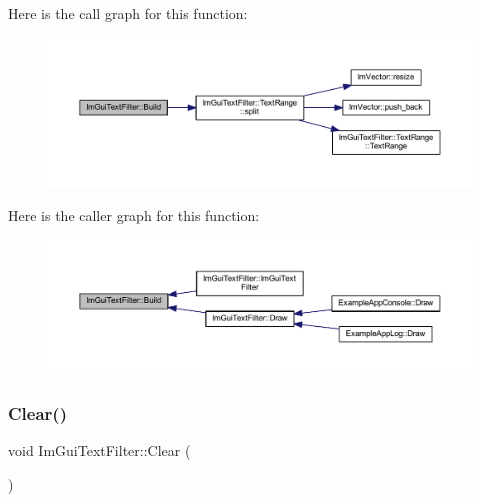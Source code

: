 Here is the call graph for this function\+:
\nopagebreak
\begin{figure}[H]
\begin{center}
\leavevmode
\includegraphics[width=350pt]{struct_im_gui_text_filter_aef362baafaa9dfa62d11bc6101c0f4c1_cgraph}
\end{center}
\end{figure}
Here is the caller graph for this function\+:
\nopagebreak
\begin{figure}[H]
\begin{center}
\leavevmode
\includegraphics[width=350pt]{struct_im_gui_text_filter_aef362baafaa9dfa62d11bc6101c0f4c1_icgraph}
\end{center}
\end{figure}
\mbox{\label{struct_im_gui_text_filter_a9043c1f0c33d29e6fc9b75ae81f9705a}} 
\subsubsection{\texorpdfstring{Clear()}{Clear()}}
{\footnotesize\ttfamily void Im\+Gui\+Text\+Filter\+::\+Clear (\begin{DoxyParamCaption}{ }\end{DoxyParamCaption})\hspace{0.3cm}{\ttfamily [inline]}}

\mbox{\label{struct_im_gui_text_filter_ab93ad5985019ff9d3781606551fc26cc}} 
